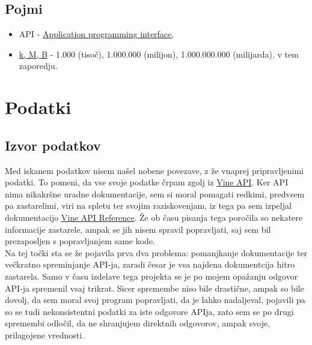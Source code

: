 \documentclass[a4paper,11pt]{article}
\begin{document}
\subsection{Pojmi}
\begin{itemize}
  \item API - \href{http://en.wikipedia.org/wiki/Application_programming_interface}{\underline{Application programming interface}},
  \item \href{http://sl.wikipedia.org/wiki/Predpone_SI}{\underline{k, M, B}} - 1.000 (tisoč), 1.000.000 (milijon), 1.000.000.000 (milijarda), v tem zaporedju.
\end{itemize}

\pagebreak
\section{Podatki}

\subsection{Izvor podatkov}

Med iskanem podatkov nisem našel nobene povezave, z že vnaprej pripravljenimi podatki. To pomeni, da vse svoje podatke črpam zgolj iz \href{https://api.vineapp.com}{\underline{Vine API}}. Ker API nima nikakršne uradne dokumentacije, sem si moral pomagati redkimi, predvsem pa zastarelimi, viri na spletu ter svojim raziskovenjam, iz tega pa sem izpeljal dokumentacijo \href{https://github.com/markogresak/vine-data-mining/blob/master/API-reference.md}{\underline{Vine API Reference}}. Že ob času pisanja tega poročila so nekatere informacije zastarele, ampak se jih nisem spravil popravljati, saj sem bil prezaposljen s popravljanjem same kode.
\\
Na tej točki sta se že pojavila prva dva problema: pomanjkanje dokumentacije ter večkratno spreminjanje API-ja, zaradi česar je vsa najdena dokumentcija hitro zastarela. Samo v času izdelave tega projekta se je po mojem opažanju odgovor API-ja spremenil vsaj trikrat. Sicer spremembe niso bile drastične, ampak so bile dovolj, da sem moral svoj program popravljati, da je lahko nadaljeval, pojavili pa so se tudi nekonsistentni podatki za iste odgovore APIja, zato sem se po drugi spremembi odločil, da ne shranjujem direktnih odgovorov, ampak svoje, prilagojene vrednosti.
\end{document}
